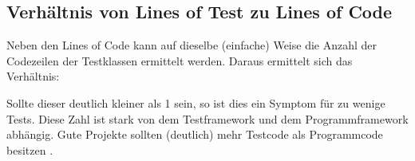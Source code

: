 \subsection{Verhältnis von Lines of Test zu Lines of Code}
Neben den Lines of Code kann auf dieselbe (einfache) Weise die Anzahl der Codezeilen der Testklassen ermittelt werden. Daraus ermittelt sich das Verhältnis:


Sollte dieser deutlich kleiner als 1 sein, so ist dies ein Symptom für zu wenige Tests. Diese Zahl ist stark von dem Testframework und dem Programmframework abhängig. Gute Projekte sollten (deutlich) mehr Testcode als Programmcode besitzen \citep[S. 238]{hunt_pragmatic_1999}.

